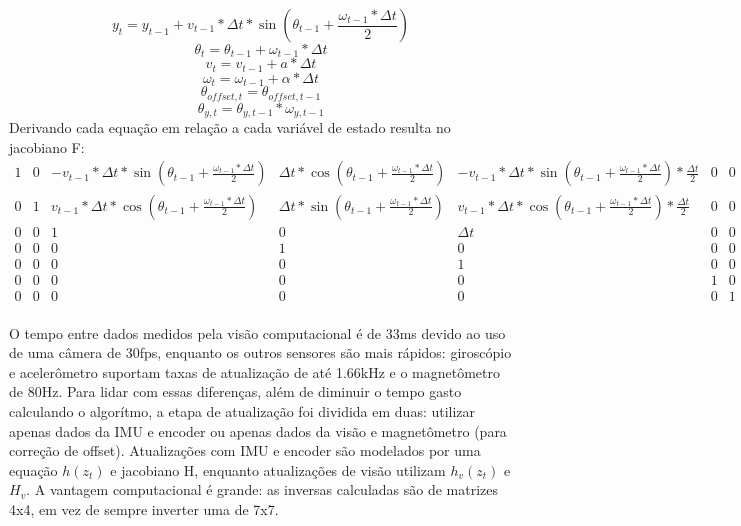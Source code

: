 \documentclass[
	12pt,				%
	openright,			%
	twoside,			%
	convert,
	a4paper,			%
	english,			%
	french,				%
	spanish,			%
	brazil				%
	]{abntex2}
\begin{document}
\begin{equation}
	y_t = y_{t-1} + v_{t-1} * \Delta t * \sin(\theta_{t-1} + \frac{\omega_{t-1} * \Delta t}{2})
\end{equation}
\begin{equation}
	\theta_t = \theta_{t-1} + \omega_{t-1} * \Delta t
\end{equation}
\begin{equation}
	v_t = v_{t-1} + a * \Delta t
\end{equation}
\begin{equation}
	\omega_t = \omega_{t-1} + \alpha * \Delta t
\end{equation}
\begin{equation}
	\theta_{offset, t} = \theta_{offset, t-1}
\end{equation}
\begin{equation}
	\theta_{y, t} = \theta_{y, t - 1} * \omega_{y, t-1}
\end{equation}
Derivando cada equação em relação a cada variável de estado resulta no jacobiano F:
\begin{equation}
\begin{smallmatrix}
	1 & 0 
	& -v_{t-1} * \Delta t * \sin(\theta_{t-1} + \frac{\omega_{t-1} * \Delta t}{2})
	& \Delta t * \cos(\theta_{t-1} + \frac{\omega_{t-1} * \Delta t}{2}) 
	& -v_{t-1} * \Delta t * \sin(\theta_{t-1} + \frac{\omega_{t-1} * \Delta t}{2}) * \frac{\Delta t}{2} & 0 & 0\\
	0 & 1 
	& v_{t-1} * \Delta t * \cos(\theta_{t-1} + \frac{\omega_{t-1} * \Delta t}{2}) 
	& \Delta t * \sin(\theta_{t-1} + \frac{\omega_{t-1} * \Delta t}{2}) 
	& v_{t-1} * \Delta t * \cos(\theta_{t-1} + \frac{\omega_{t-1} * \Delta t}{2}) * \frac{\Delta t}{2} & 0 & 0\\
	0 & 0 & 1 & 0 & \Delta t & 0 & 0\\
	0 & 0 & 0 & 1 & 0 & 0 & 0\\
	0 & 0 & 0 & 0 & 1 & 0 & 0\\
	0 & 0 & 0 & 0 & 0 & 1 & 0\\
	0 & 0 & 0 & 0 & 0 & 0 & 1\\
\end{smallmatrix}
\end{equation}
\par
O tempo entre dados medidos pela visão computacional é de 33ms devido ao uso de uma câmera de 30fps, enquanto os outros sensores são mais rápidos: giroscópio e acelerômetro suportam taxas de atualização de até 1.66kHz e o magnetômetro de 80Hz. Para lidar com essas diferenças, além de diminuir o tempo gasto calculando o algorítmo, a etapa de atualização foi dividida em duas: utilizar apenas dados da IMU e encoder ou apenas dados da visão e magnetômetro (para correção de offset). Atualizações com IMU e encoder são modelados por uma equação $h(z_t)$ e jacobiano H, enquanto atualizações de visão utilizam $h_v(z_t)$ e $H_v$. A vantagem computacional é grande: as inversas calculadas são de matrizes 4x4, em vez de sempre inverter uma de 7x7.
\end{document}
